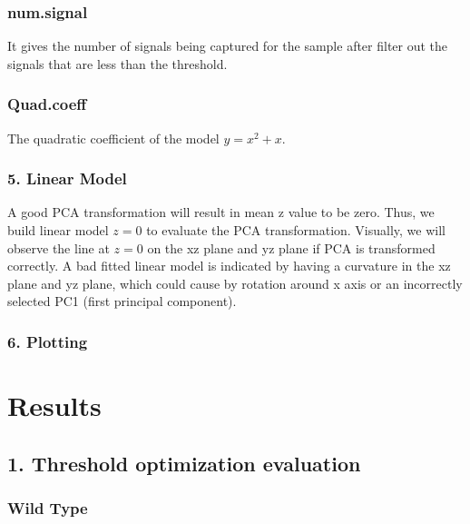 \documentclass[10pt,letterpaper]{article}
\begin{document}
\hypertarget{num.signal}{%
\subsubsection{num.signal}\label{num.signal}}

It gives the number of signals being captured for the sample after
filter out the signals that are less than the threshold.

\hypertarget{quad.coeff}{%
\subsubsection{Quad.coeff}\label{quad.coeff}}

The quadratic coefficient of the model \(y=x^2+x\).

\hypertarget{linear-model}{%
\subsubsection{5. Linear Model}\label{linear-model}}

A good PCA transformation will result in mean z value to be zero. Thus,
we build linear model \(z=0\) to evaluate the PCA transformation.
Visually, we will observe the line at \(z=0\) on the xz plane and yz
plane if PCA is transformed correctly. A bad fitted linear model is
indicated by having a curvature in the xz plane and yz plane, which
could cause by rotation around x axis or an incorrectly selected PC1
(first principal component).

\hypertarget{plotting}{%
\subsubsection{6. Plotting}\label{plotting}}

\hypertarget{results}{%
\section{Results}\label{results}}

\hypertarget{threshold-optimization-evaluation}{%
\subsection{1. Threshold optimization
evaluation}\label{threshold-optimization-evaluation}}

\hypertarget{wild-type}{%
\subsubsection{Wild Type}\label{wild-type}}
\end{document}
